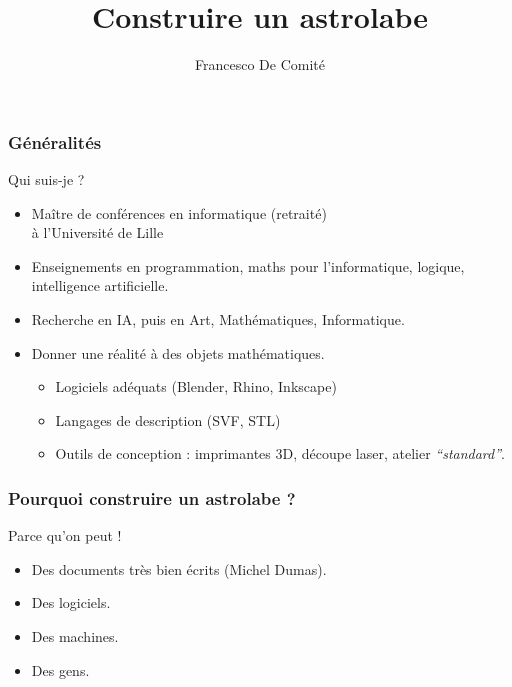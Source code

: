 \documentclass{beamer}
\title[Construire un astrolabe]{Construire un astrolabe}
\author{Francesco De Comité}\institute{Ex-Université de Lille \\ Faculté des Sciences et Technologies}
\begin{document}
 \begin{frame}
\titlepage
{}
   \end{frame}

  
 \begin{frame}\frametitle{Généralités}

\begin{block}{Qui suis-je ? }
\begin{itemize}
\item Maître de conférences en informatique (retraité) \\ à l'Université de Lille
\item Enseignements en programmation, maths pour l'informatique, logique, intelligence artificielle. 
\item Recherche en IA, puis en Art, Mathématiques, Informatique. 
\item \begin{block}{Donner une réalité à des objets mathématiques. }
	\begin{itemize}
	\item Logiciels adéquats (Blender, Rhino, Inkscape)
	\item Langages de description (SVF, STL)
	\item Outils de conception : imprimantes 3D, découpe laser, atelier {\it ``standard''}.
	\end{itemize}
	\end{block}
\end{itemize}
\end{block}

   \end{frame}


  
 \begin{frame}\frametitle{Pourquoi construire un astrolabe ?}
 
 \begin{block}{Parce qu'on peut !}
 \begin{itemize}
 \item Des documents très bien écrits (Michel Dumas).
 \item Des logiciels.
 \item Des machines.
 \item Des gens. 
 \end{itemize}
 
 
 
 \end{block}
 
\end{frame}
\end{document}
